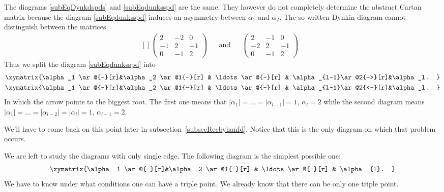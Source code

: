 The diagrams \eqref{subEqDynkdspds} and \eqref{subEqdunksspd} are the same. They however do not completely determine the abstract Cartan matrix because the diagram \eqref{subEqdunksspd} induces an asymmetry between \( \alpha_1\) and \( \alpha_2\). The so written Dynkin diagram cannot distinguish between the matrices
\begin{equation}
    \begin{aligned}[]
        \begin{pmatrix}
            2    &   -2    &   0    \\
            -1    &   2    &   -1    \\
            0    &   -1    &   2
        \end{pmatrix}&&
        \text{and}&&
        \begin{pmatrix}
            2    &   -1    &   0    \\
            -2    &   2    &   -1    \\
            0    &   -1    &   2
        \end{pmatrix}&
    \end{aligned}
\end{equation}
Thus we split the diagram \eqref{subEqdunksspd} into
\begin{subequations}        \label{suBeqdfynkabGP}
    \begin{align}
    \xymatrix{%
    \alpha_1 \ar@{-}[r]&\alpha_2  \ar@1{-}[r]   & \ldots \ar@{-}[r] & \alpha_{l-1}\ar@2{->}[r]&\alpha_l.
    }   \\
    \xymatrix{%
    \alpha_1 \ar@{-}[r]&\alpha_2  \ar@1{-}[r]   & \ldots \ar@{-}[r] & \alpha_{l-1}\ar@2{<-}[r]&\alpha_l.
    }
    \end{align}
\end{subequations}
In which the arrow points to the biggest root. The first one means that \( | \alpha_1 |=\ldots=| \alpha_{l-1} |=1\), \( \alpha_{l}=2\) while the second diagram means \( | \alpha_1 |=\ldots=| \alpha_{l-2} |=| \alpha_l |=1\), \( \alpha_{l-1}=2\).

We'll have to come back on this point later in subsection~\ref{subsecRecbyhanfd}. Notice that this is the only diagram on which that problem occurs.

We are left to study the diagrams with only single edge. The following diagram is the simplest possible one:
\begin{equation}
    \xymatrix{%
    \alpha_1 \ar@{-}[r]&\alpha_2  \ar@1{-}[r]   & \ldots \ar@{-}[r] & \alpha_{l}.
       }
\end{equation}
We have to know under what conditions one can have a triple point. We already know that there can be only one triple point.


